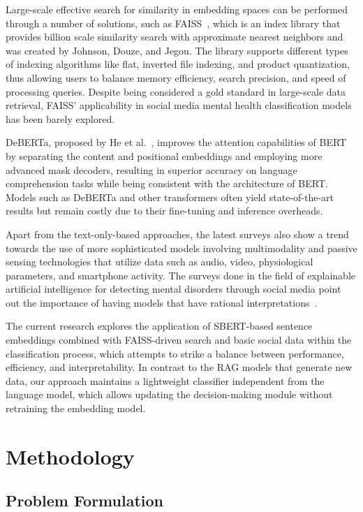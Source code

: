\documentclass[11pt]{article}
\begin{document}
Large-scale effective search for similarity in embedding spaces can be performed through a number of solutions, such as FAISS~\cite{johnson2021}, which is an index library that provides billion scale similarity search with approximate nearest neighbors and was created by Johnson, Douze, and Jegou. The library supports different types of indexing algorithms like flat, inverted file indexing, and product quantization, thus allowing users to balance memory efficiency, search precision, and speed of processing queries. Despite being considered a gold standard in large-scale data retrieval, FAISS' applicability in social media mental health classification models has been barely explored.

DeBERTa, proposed by He et al.~\cite{he2021}, improves the attention capabilities of BERT by separating the content and positional embeddings and employing more advanced mask decoders, resulting in superior accuracy on language comprehension tasks while being consistent with the architecture of BERT. Models such as DeBERTa and other transformers often yield state-of-the-art results but remain costly due to their fine-tuning and inference overheads.

Apart from the text-only-based approaches, the latest surveys also show a trend towards the use of more sophisticated models involving multimodality and passive sensing technologies that utilize data such as audio, video, physiological parameters, and smartphone activity. The surveys done in the field of explainable artificial intelligence for detecting mental disorders through social media point out the importance of having models that have rational interpretations~\cite{chancellor2020}.

The current research explores the application of SBERT-based sentence embeddings combined with FAISS-driven search and basic social data within the classification process, which attempts to strike a balance between performance, efficiency, and interpretability. In contrast to the RAG models that generate new data, our approach maintains a lightweight classifier independent from the language model, which allows updating the decision-making module without retraining the embedding model.

\section{Methodology}

\subsection{Problem Formulation}
\end{document}
